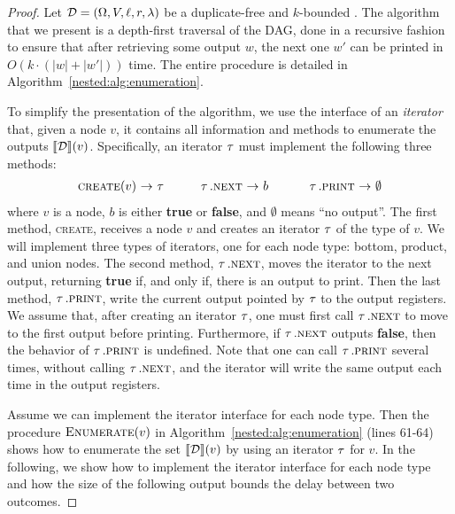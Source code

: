 

\begin{proof}
Let $\mathcal{D} = (\Omega, V, \ell, r, \lambda)$ be a duplicate-free and $k$-bounded \dsabbr{}.
The algorithm that we present is a depth-first traversal of the DAG, done in a recursive fashion to ensure that after retrieving some output $w$, the next one $w'$ can be printed in $O(k\cdot (|w| + |w'|))$ time. The entire procedure is detailed in Algorithm~\ref{nested:alg:enumeration}.



To simplify the presentation of the algorithm, we use the interface of an \emph{iterator} that, given a node $v$, it contains all information and methods to enumerate the outputs ${\llbracket{\mathcal{D}}\rrbracket}(v)$. Specifically, an iterator $\operatorname{\tau}$ must implement the following three methods:
\[
\begin{array}{rclrclrcl}
	\textsc{create}(v) & \!\!\!\!\rightarrow\!\!\!\! & \uit   \ \ \ \ \ \	 & \uit.\textsc{next} & \!\!\!\! \rightarrow \!\!\!\! & b  \ \ \ \ \ \ \ &  \uit.\textsc{print}  & \!\!\!\!\rightarrow\!\!\!\! & \emptyset
\end{array}
\]
where $v$ is a node, $b$ is either {\bf true} or {\bf false}, and $\emptyset$ means ``no output''. 
The first method, \textsc{create}, receives a node $v$ and creates an iterator $\operatorname{\tau}$ of the type of $v$. We will implement three types of iterators, one for each node type: bottom, product, and union nodes. The second method, $\operatorname{\tau}.\textsc{next}$, moves the iterator to the next output, returning {\bf true} if, and only if, there is an output to print. Then the last method, $\operatorname{\tau}.\textsc{print}$, write the current output pointed by $\operatorname{\tau}$ to the output registers. 
We assume that, after creating an iterator $\operatorname{\tau}$, one must first call $\operatorname{\tau}.\textsc{next}$ to move to the first output before printing. Furthermore, if $\operatorname{\tau}.\textsc{next}$ outputs {\bf false}, then the behavior of $\operatorname{\tau}.\textsc{print}$ is undefined. Note that one can call $\operatorname{\tau}.\textsc{print}$ several times, without calling $\operatorname{\tau}.\textsc{next}$, and the iterator will write the same output each time in the output registers. 

Assume we can implement the iterator interface for each node type. Then the procedure $\textsc{Enumerate}(v)$ in Algorithm~\ref{nested:alg:enumeration} (lines 61-64) shows how to enumerate the set ${\llbracket{\mathcal{D}}\rrbracket}(v)$ by using an iterator $\operatorname{\tau}$ for $v$. In the following, we show how to implement the iterator interface for each node type and how the size of the following output bounds the delay between two outcomes.


\end{proof}
